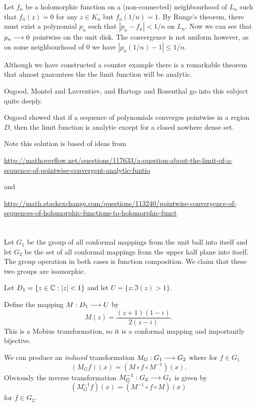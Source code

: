 \documentclass{unswmaths}
\begin{document}
Let $ f_n $ be a holomorphic function on a (non-connected) neighbourhood of $ L_n $ such that $ f_n(z) = 0 $ for any $ z \in K_n $ but $ f_n(1/n) = 1 $. By Runge's theorem, there must exist a polynomial $ p_n $ such that $ |p_n - f_n| < 1/n $ on $ L_n $. Now we can see that $ p_n \longrightarrow 0 $ pointwise  on the unit disk. The convergence is not uniform however, as on some neighbourhood of $ 0 $ we have $ |p_n(1/n) - 1| \leq 1/n $.

Although we have constructed a counter example there is a remarkable theorem that almost guarantees the the limit function will be analytic. 

Osgood, Montel and Lavrentiev, \cite{Osgood1936} and Hartogs and Rosenthal\cite{Hartogs1928} go into this subject quite deeply. 

Osgood showed that if a sequence of polynomials converges pointwise in a region $ D $, then the limit function is analytic except for a closed nowhere dense set.

Note this solution is based of ideas from 

\url{http://mathoverflow.net/questions/117633/a-question-about-the-limit-of-a-sequence-of-pointwise-convergent-analytic-funtio} 

and

\url{http://math.stackexchange.com/questions/113240/pointwise-convergence-of-sequences-of-holomorphic-functions-to-holomorphic-funct}

\section{}

Let $ G_1 $ be the group of all conformal mappings from the unit ball into itself and let $ G_2 $ be the set of all conformal mappings from the upper half plane into itself. The group operation in both cases is function composition.  We claim that these two groups are isomorphic. 

Let $ D_1 = \{ z \in \mathbb{C} : |z| < 1 \} $ and let $ U = \{ z : \Im(z) > 1 \} $.

Define the mapping $ M : D_1 \longrightarrow U $ by
$$ M(z) = \frac{(z+1)(1-i)}{2(z-i)}.$$
This is a Mobius transformation, so it is a conformal mapping and importantly bijective. 

We can produce an \emph{induced} transformation $ M_G : G_1 \longrightarrow G_2 $ where for $ f \in G_1 $
$$
	(M_G f)(x) = (M \circ f \circ M^{-1})(x).
$$
Obviously the inverse transformation $ M^{-1}_G : G_2 \longrightarrow G_1 $ is given by 
$$
	(M^{-1}_G f)(x) = (M^{-1} \circ f \circ M)(x) 
$$
for $ f \in G_2 $.
\end{document}

